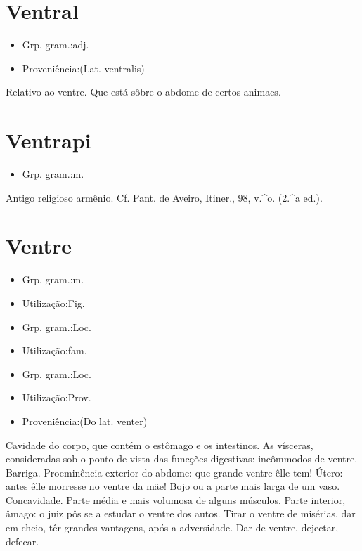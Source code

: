 \documentclass{article}
\begin{document}
\section{Ventral}
\begin{itemize}
\item {Grp. gram.:adj.}
\end{itemize}
\begin{itemize}
\item {Proveniência:(Lat. \textunderscore ventralis\textunderscore )}
\end{itemize}
Relativo ao ventre.
Que está sôbre o abdome de certos animaes.
\section{Ventrapi}
\begin{itemize}
\item {Grp. gram.:m.}
\end{itemize}
Antigo religioso armênio. Cf. Pant. de Aveiro, \textunderscore Itiner.\textunderscore , 98, v.^o. (2.^a ed.).
\section{Ventre}
\begin{itemize}
\item {Grp. gram.:m.}
\end{itemize}
\begin{itemize}
\item {Utilização:Fig.}
\end{itemize}
\begin{itemize}
\item {Grp. gram.:Loc.}
\end{itemize}
\begin{itemize}
\item {Utilização:fam.}
\end{itemize}
\begin{itemize}
\item {Grp. gram.:Loc.}
\end{itemize}
\begin{itemize}
\item {Utilização:Prov.}
\end{itemize}
\begin{itemize}
\item {Proveniência:(Do lat. \textunderscore venter\textunderscore )}
\end{itemize}
Cavidade do corpo, que contém o estômago e os intestinos.
As vísceras, consideradas sob o ponto de vista das funcções digestivas: \textunderscore incômmodos de ventre\textunderscore .
Barriga.
Proeminência exterior do abdome: \textunderscore que grande ventre êlle tem\textunderscore !
Útero: \textunderscore antes êlle morresse no ventre da mãe\textunderscore !
Bojo ou a parte mais larga de um vaso.
Concavidade.
Parte média e mais volumosa de alguns músculos.
Parte interior, âmago: \textunderscore o juiz pôs se a estudar o ventre dos autos\textunderscore .
\textunderscore Tirar o ventre de misérias\textunderscore , dar em cheio, têr grandes vantagens, após a adversidade.
\textunderscore Dar de ventre\textunderscore , dejectar, defecar.
\end{document}
